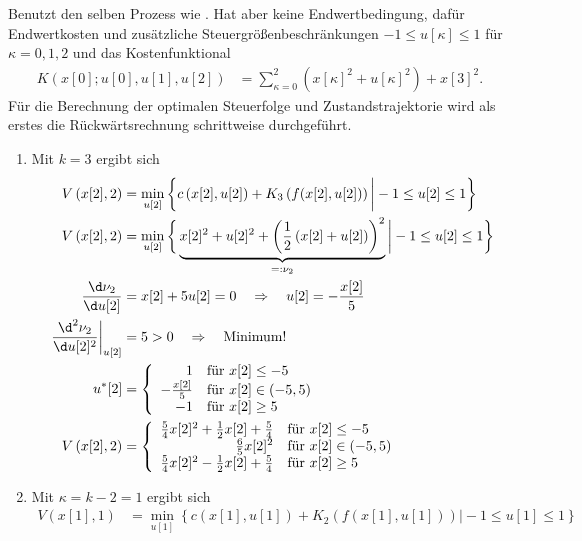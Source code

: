 \begin{exmp}\label{exmp:kap_3_zeitdis_opt_2}
Benutzt den selben Prozess wie . Hat aber keine Endwertbedingung, dafür Endwertkosten und zusätzliche
Steuergrößenbeschränkungen $-1\leq u[\kappa]\leq 1$ für $\kappa=0,1,2$ und das Kostenfunktional
\begin{align*}
	K\left(x[0];u[0],u[1],u[2]\right) & = \sum\limits_{\kappa=0}^2\left(x[\kappa]^2+u[\kappa]^2 \right) + x[3]^2.
\end{align*}
Für die Berechnung der optimalen Steuerfolge und Zustandstrajektorie wird als erstes die Rückwärtsrechnung schrittweise durchgeführt. 
\begin{enumerate}[label=(S\arabic*)]
  \item Mit $k=3$ ergibt sich
\begin{align*}
	V\left(x[2],2\right) & = \min\limits_{u[2]}\left\{c\left(x[2],u[2]\right) + K_3\left(f(x[2],u[2]) \right)\bigg| -1\leq u[2]\leq 1 \right\}\\
	V\left(x[2],2\right) & = \min\limits_{u[2]}\bigg\{\underbrace{x[2]^2+u[2]^2+\left(\frac12\left(x[2]+u[2]\right) \right)^2}_{=:\nu_2} \bigg| -1\leq
	u[2] \leq 1 \bigg\}\\
	\frac{\d \nu_2}{\d u[2]} & = x[2]+5u[2]=0\quad \Rightarrow \quad u[2]=-\frac{x[2]}{5}\\
	\left.\frac{\d^2 \nu_2}{\d u[2]^2}\right|_{u[2]} & = 5 > 0 \quad \Rightarrow\quad\text{Minimum!}\\
	u^{\ast}[2] & = \left\{\begin{array}{rl}
	1 & \text{für } x[2]\leq -5\\
	-\frac{x[2]}{5} & \text{für } x[2]\in(-5,5)\\
	-1 & \text{für } x[2]\geq 5
	\end{array} \right.\\
	V\left(x[2],2\right) & = \left\{\begin{array}{rl}
	\frac54x[2]^2+\frac12x[2]+\frac54 & \text{für } x[2]\leq -5\\
	\frac65x[2]^2 & \text{für } x[2]\in(-5,5)\\
	\frac54x[2]^2-\frac12x[2]+\frac54 & \text{für }x[2]\geq 5
	\end{array}
	\right.
\end{align*}
	\item Mit $\kappa = k - 2 = 1$ ergibt sich
\begin{align*}
	V\left(x[1],1\right) & = \min\limits_{u[1]}\left\{c\left(x[1],u[1]\right) + K_2\left(f(x[1],u[1]) \right)\bigg| -1\leq u[1]\leq 1 \right\}\\

\end{align*}
\end{enumerate}
\end{exmp}
